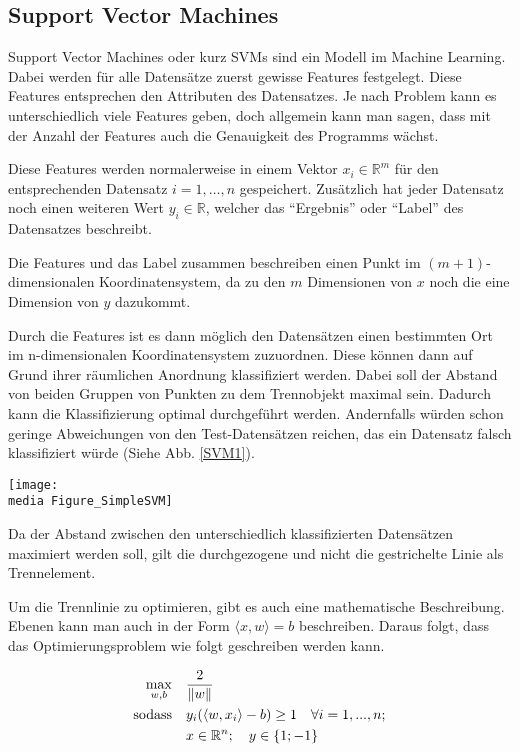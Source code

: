 \subsection{Support Vector Machines}
\author{David Steinmann}
Support Vector Machines oder kurz SVMs sind ein Modell im Machine Learning.
Dabei werden für alle Datensätze zuerst gewisse Features festgelegt. Diese Features entsprechen den Attributen des Datensatzes. Je nach Problem kann es unterschiedlich viele Features geben, doch allgemein kann man sagen, dass mit der Anzahl der Features auch die Genauigkeit des Programms wächst.

Diese Features werden normalerweise in einem Vektor $x_i\in \mathbb{R}^m$ für den entsprechenden Datensatz $i = 1, \dots, n$ gespeichert.
Zusätzlich hat jeder Datensatz noch einen weiteren Wert $y_{i} \in \mathbb{R}$, welcher das \enquote{Ergebnis} oder \enquote{Label} des Datensatzes beschreibt.

Die Features und das Label zusammen beschreiben einen Punkt im $(m+1)$-dimensionalen Koordinatensystem, da zu den $m$ Dimensionen von $x$ noch die eine Dimension von $y$ dazukommt.

Durch die Features ist es dann möglich den Datensätzen einen bestimmten Ort im n-dimensionalen Koordinatensystem zuzuordnen. Diese können dann auf Grund ihrer räumlichen Anordnung klassifiziert werden. Dabei soll der Abstand von beiden Gruppen von Punkten zu dem Trennobjekt maximal sein. Dadurch kann die Klassifizierung optimal durchgeführt werden. Andernfalls würden schon geringe Abweichungen von den Test-Datensätzen reichen, das ein Datensatz falsch klassifiziert würde (Siehe Abb. \ref{SVM1}). 


\begin{dsafigure}
\begin{center}
	\label{SVM1}
	\texttt{[image: \\media Figure\_SimpleSVM]}
	\caption{Da der Abstand zwischen den unterschiedlich klassifizierten Datensätzen maximiert werden soll, gilt die durchgezogene und nicht die gestrichelte Linie als Trennelement.}
	\end{center}
\end{dsafigure}


Um die Trennlinie zu optimieren, gibt es auch eine mathematische Beschreibung. Ebenen kann man auch in der Form $\langle x, w \rangle = b $ beschreiben. Daraus folgt, dass das Optimierungsproblem wie folgt geschreiben werden kann.

\begin{align*}
	\underset{w,b}{\operatorname{max}} \quad & \frac{2}{\left\lVert w\right\rVert} \\
	\operatorname{sodass} \quad &y_{i}(\langle w,x_{i} \rangle -b) \geq 1 \quad \forall  i = 1,...,n ; \\
	&x \in \mathbb{R}^n; \quad	y \in \{1;-1\}
\end{align*}


